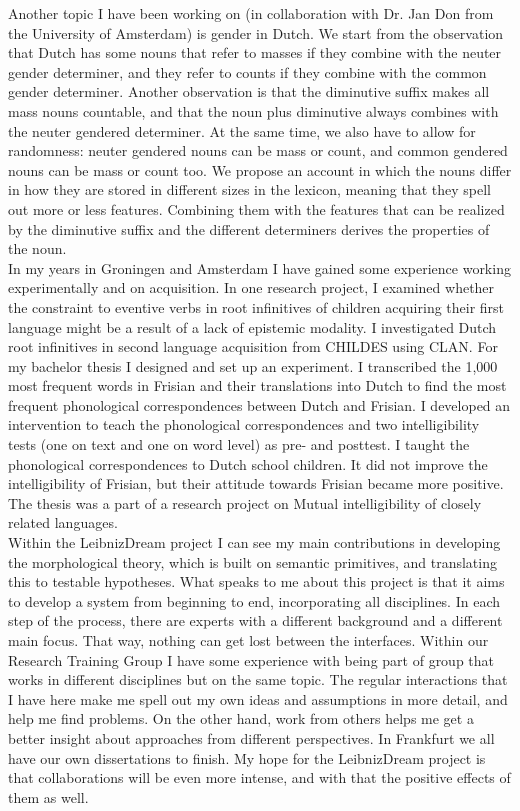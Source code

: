 \documentclass[12pt]{article}
\begin{document}
Another topic I have been working on (in collaboration with Dr. Jan Don from the University of Amsterdam) is gender in Dutch. We start from the observation that Dutch has some nouns that refer to masses if they combine with the neuter gender determiner, and they refer to counts if they combine with the common gender determiner. Another observation is that the diminutive suffix makes all mass nouns countable, and that the noun plus diminutive always combines with the neuter gendered determiner. At the same time, we also have to allow for randomness: neuter gendered nouns can be mass or count, and common gendered nouns can be mass or count too. We propose an account in which the nouns differ in how they are stored in different sizes in the lexicon, meaning that they spell out more or less features. Combining them with the features that can be realized by the diminutive suffix and the different determiners derives the properties of the noun.\\

In my years in Groningen and Amsterdam I have gained some experience working experimentally and on acquisition. In one research project, I examined whether the constraint to eventive verbs in root infinitives of children acquiring their first language might be a result of a lack of epistemic modality. I investigated Dutch root infinitives in second language acquisition from CHILDES using CLAN. For my bachelor thesis I designed and set up an experiment. I transcribed the 1,000 most frequent words in Frisian and their translations into Dutch to find the most frequent phonological correspondences between Dutch and Frisian. I developed an intervention to teach the phonological correspondences and two intelligibility tests (one on text and one on word level) as pre- and posttest. I taught the phonological correspondences to Dutch school children. It did not improve the intelligibility of Frisian, but their attitude towards Frisian became more positive. The thesis was a part of a research project on Mutual intelligibility of closely related languages.\\

Within the LeibnizDream project I can see my main contributions in developing the morphological theory, which is built on semantic primitives, and translating this to testable hypotheses. What speaks to me about this project is that it aims to develop a system from beginning to end, incorporating all disciplines. In each step of the process, there are experts with a different background and a different main focus. That way, nothing can get lost between the interfaces. Within our Research Training Group I have some experience with being part of group that works in different disciplines but on the same topic. The regular interactions that I have here make me spell out my own ideas and assumptions in more detail, and help me find problems. On the other hand, work from others helps me get a better insight about approaches from different perspectives. In Frankfurt we all have our own dissertations to finish. My hope for the LeibnizDream project is that collaborations will be even more intense, and with that the positive effects of them as well.\\
\end{document}
